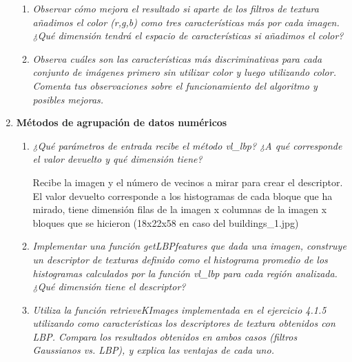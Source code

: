 \documentclass{article}
\begin{document}
\begin{enumerate}
\begin{enumerate}
 \item \textit{Observar cómo mejora el resultado si aparte de los filtros de textura añadimos el color  (r,g,b)  como  tres  características  más  por  cada  imagen.  ¿Qué  dimensión tendrá el espacio de características si añadimos el color?}

 \item \textit{Observa cuáles son las características más discriminativas para cada conjunto de imágenes  primero  sin  utilizar  color  y  luego  utilizando  color.  Comenta  tus observaciones sobre el funcionamiento del algoritmo y posibles mejoras.}

 
 \end{enumerate}

\newpage

 \item \textbf{Métodos de agrupación de datos numéricos}

 \begin{enumerate}
 \item \textit{¿Qué parámetros de entrada recibe el método vl\_lbp? ¿A qué corresponde el valor devuelto y qué dimensión tiene?}

	Recibe la imagen y el número de vecinos a mirar para crear el descriptor. El valor devuelto corresponde a los histogramas de cada bloque que ha mirado, tiene dimensión filas de la imagen x columnas de la imagen x bloques que se hicieron (18x22x58 en caso del buildings\_1.jpg)

 \item \textit{  Implementar una  función getLBPfeatures que dada una imagen, construye un  descriptor  de  texturas  definido  como  el  histograma  promedio  de  los histogramas  calculados  por  la  función  vl\_lbp para cada  región analizada.  ¿Qué dimensión tiene el descriptor?}

 \item \textit{Utiliza la  función  retrieveKImages implementada en el ejercicio  4.1.5  utilizando como características los descriptores de textura obtenidos con LBP. Compara los resultados  obtenidos en ambos  casos  (filtros Gaussianos  vs.  LBP),  y  explica las ventajas de cada uno.}

 \end{enumerate}

\end{enumerate}
\end{document}
